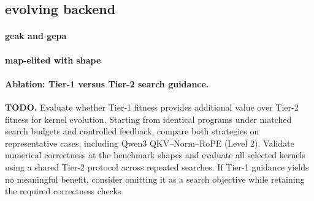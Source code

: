 
\subsection{evolving backend}
\paragraph{geak and gepa}
\paragraph{map-elited with shape}

\paragraph{Ablation: Tier-1 versus Tier-2 search guidance.}
\textbf{TODO.}
Evaluate whether Tier-1 fitness provides additional value over
Tier-2 fitness for kernel evolution. Starting from identical programs
under matched search budgets and controlled feedback, compare both
strategies on representative cases, including Qwen3 QKV--Norm--RoPE
(Level 2). Validate numerical correctness at the benchmark shapes
and evaluate all selected kernels using a shared Tier-2 protocol
across repeated searches. If Tier-1 guidance yields no meaningful
benefit, consider omitting it as a search objective while retaining
the required correctness checks.